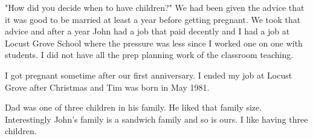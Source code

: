 "How did you decide when to have children?"
We had been given the advice that it was good to be married at least a year before getting pregnant.
We took that advice and after a year John had a job that paid decently and I had a job at Locust Grove School where the pressure was less since I worked one on one with students.
I did not have all the prep planning work of the classroom teaching.

I got pregnant sometime after our first anniversary.
I ended my job at Locust Grove after Christmas and Tim was born in May 1981.

Dad was one of three children in his family.
He liked that family size.
Interestingly John's family is a sandwich family and so is ours.
I like having three children.





